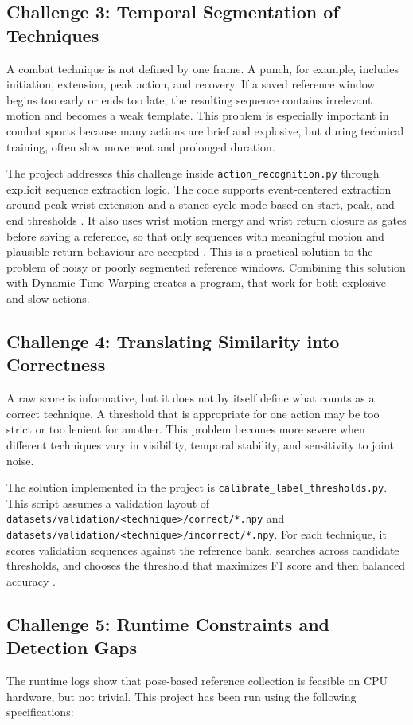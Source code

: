 \documentclass[12pt]{article}
\begin{document}
\subsection{Challenge 3: Temporal Segmentation of Techniques}
A combat technique is not defined by one frame. A punch, for example, includes initiation, extension, peak action, and recovery. If a saved reference window begins too early or ends too late, the resulting sequence contains irrelevant motion and becomes a weak template. This problem is especially important in combat sports because many actions are brief and explosive, but during technical training, often slow movement and prolonged duration.

The project addresses this challenge inside \texttt{action\_recognition.py} through explicit sequence extraction logic. The code supports event-centered extraction around peak wrist extension and a stance-cycle mode based on start, peak, and end thresholds \cite{projectActionRecognition}. It also uses wrist motion energy and wrist return closure as gates before saving a reference, so that only sequences with meaningful motion and plausible return behaviour are accepted \cite{projectActionRecognition}. This is a practical solution to the problem of noisy or poorly segmented reference windows.
Combining this solution with Dynamic Time Warping creates a program, that work for both explosive and slow actions.

\subsection{Challenge 4: Translating Similarity into Correctness}
A raw score is informative, but it does not by itself define what counts as a correct technique. A threshold that is appropriate for one action may be too strict or too lenient for another. This problem becomes more severe when different techniques vary in visibility, temporal stability, and sensitivity to joint noise.

The solution implemented in the project is \texttt{calibrate\_label\_thresholds.py}. This script assumes a validation layout of \texttt{datasets/validation/<technique>/correct/*.npy} and \texttt{datasets/validation/<technique>/incorrect/*.npy}. For each technique, it scores validation sequences against the reference bank, searches across candidate thresholds, and chooses the threshold that maximizes F1 score and then balanced accuracy \cite{projectCalibrate}.

\subsection{Challenge 5: Runtime Constraints and Detection Gaps}
The runtime logs show that pose-based reference collection is feasible on CPU hardware, but not trivial. This project has been run using the following specifications:
\end{document}
